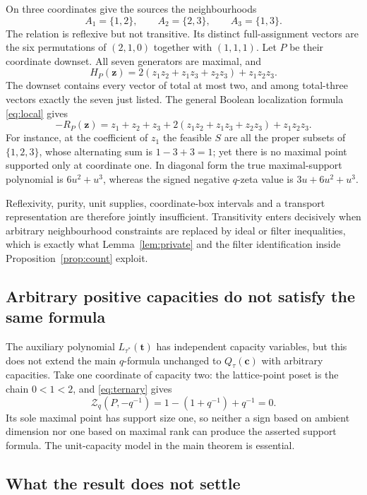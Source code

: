 \documentclass[11pt]{article}
\numberwithin{equation}{section}
\theoremstyle{definition}
\theoremstyle{remark}
\newcommand{\Zeta}{\mathcal Z}
\begin{document}
On three coordinates give the sources the neighbourhoods
\[
 A_1=\{1,2\},\qquad A_2=\{2,3\},\qquad A_3=\{1,3\}.
\]
The relation is reflexive but not transitive. Its distinct full-assignment
vectors are the six permutations of $(2,1,0)$ together with $(1,1,1)$. Let $P$
be their coordinate downset. All seven generators are maximal, and
\begin{equation}
 H_P(\mathbf z)=2(z_1z_2+z_1z_3+z_2z_3)+z_1z_2z_3.
 \label{eq:counter-support}
\end{equation}
The downset contains every vector of total at most two, and among total-three
vectors exactly the seven just listed. The general Boolean localization
formula \eqref{eq:local} gives
\begin{equation}
 -R_P(\mathbf z)
 =z_1+z_2+z_3+2(z_1z_2+z_1z_3+z_2z_3)+z_1z_2z_3 .
 \label{eq:counter-boolean}
\end{equation}
For instance, at the coefficient of $z_1$ the feasible $S$ are all the proper
subsets of $\{1,2,3\}$, whose alternating sum is $1-3+3=1$; yet there is no
maximal point supported only at coordinate one. In diagonal form the true
maximal-support polynomial is $6u^2+u^3$, whereas the signed negative
$q$-zeta value is $3u+6u^2+u^3$.

Reflexivity, purity, unit supplies, coordinate-box intervals and a transport
representation are therefore jointly insufficient. Transitivity enters
decisively when arbitrary neighbourhood constraints are replaced by ideal or
filter inequalities, which is exactly what Lemma~\ref{lem:private} and the
filter identification inside Proposition~\ref{prop:count} exploit.

\subsection{Arbitrary positive capacities do not satisfy the same formula}

The auxiliary polynomial $L_{\tau^*}(\mathbf t)$ has independent capacity
variables, but this does not extend the main $q$-formula unchanged to
$Q_\tau(\mathbf c)$ with arbitrary capacities. Take one coordinate of capacity
two: the lattice-point poset is the chain $0<1<2$, and \eqref{eq:ternary}
gives
\[
 \Zeta_q(P,-q^{-1})=1-(1+q^{-1})+q^{-1}=0 .
\]
Its sole maximal point has support size one, so neither a sign based on
ambient dimension nor one based on maximal rank can produce the asserted
support formula. The unit-capacity model in the main theorem is essential.

\subsection{What the result does not settle}
\label{sec:notsettled}
\end{document}
